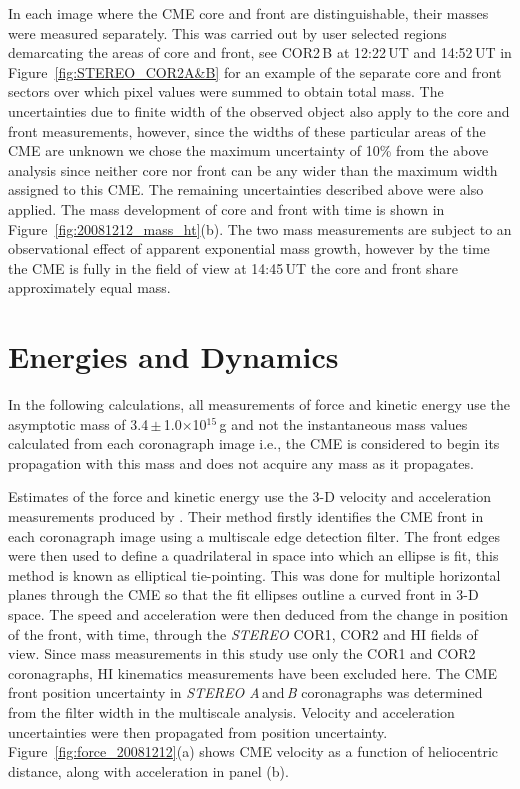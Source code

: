 In each image where the CME core and front are distinguishable, their masses were measured separately. This was carried out by user selected 
regions demarcating the areas of core and front, see COR2\,B at 12:22\,UT and 14:52\,UT in Figure~\ref{fig:STEREO_COR2A&B} for an example of the separate core and front 
sectors over which pixel values were summed to obtain total mass. The uncertainties due to finite width of the observed object also apply to the 
core and front measurements, however, since the widths of these particular areas of the CME are unknown we chose the maximum uncertainty of 
10\% from the above analysis since neither core nor front can be any wider than the maximum width assigned to this CME. The remaining 
uncertainties described above were also applied. The mass development of core and front with time is shown in Figure~\ref{fig:20081212_mass_ht}(b). The two mass 
measurements are subject to an observational effect of apparent exponential mass growth, however by the time the CME is fully in the field of view 
at 14:45\,UT the core and front share approximately equal mass. 


\section{Energies and Dynamics}\label{sec:2}

In the following calculations, all measurements of force and kinetic energy use the asymptotic mass of 3.4\,$\pm$\,1.0$\times$10$^{15}$\,g and 
not the instantaneous mass values calculated from each coronagraph image i.e., the CME is considered to begin its propagation with this mass and 
does not acquire any mass as it propagates. 

Estimates of the force and kinetic energy use the 3-D velocity and acceleration measurements produced by \citet{byr10}. Their method firstly identifies the CME front in each coronagraph image using a multiscale edge detection filter. The front edges were then used to define a quadrilateral in space into which an ellipse is fit, this method is known as elliptical tie-pointing. This was done for multiple horizontal planes through the CME so that the fit ellipses outline a curved front in 3-D space.
The speed and acceleration were then deduced from the change in position of the front, with time, through the \emph{STEREO} COR1, 
COR2 and HI fields of view. Since mass measurements in this study use only the COR1 and COR2 coronagraphs, HI kinematics measurements have been excluded here. The CME front position uncertainty in \emph{STEREO A}\,and\,\emph{B} coronagraphs was determined from the filter width in the multiscale analysis. Velocity and acceleration uncertainties were then propagated from position uncertainty.  Figure~\ref{fig:force_20081212}(a) shows CME velocity as a function of heliocentric distance, along with acceleration in panel (b). 


